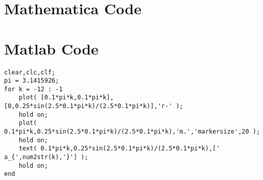 \documentclass[../Paper.tex]{subfiles}
\begin{document}
\appendix

\section{Mathematica Code}



\section{Matlab Code}
\begin{verbatim}
clear,clc,clf;
pi = 3.1415926; 
for k = -12 : -1
    plot( [0.1*pi*k,0.1*pi*k],[0,0.25*sin(2.5*0.1*pi*k)/(2.5*0.1*pi*k)],'r-' );
    hold on;
    plot( 0.1*pi*k,0.25*sin(2.5*0.1*pi*k)/(2.5*0.1*pi*k),'m.','markersize',20 );
    hold on;
    text( 0.1*pi*k,0.25*sin(2.5*0.1*pi*k)/(2.5*0.1*pi*k),['  a_{',num2str(k),'}'] );
    hold on;
end
\end{verbatim}
\end{document}
